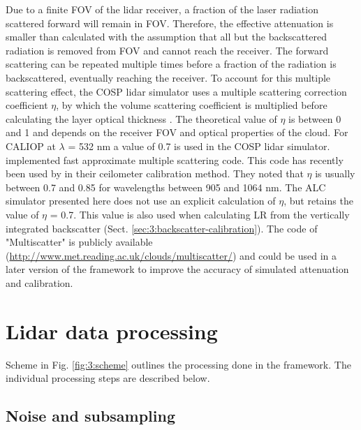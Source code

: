 Due to a finite FOV of the lidar receiver, a fraction of the laser
radiation scattered forward will remain in FOV. Therefore,
the effective attenuation is smaller than calculated with the assumption
that all but the backscattered radiation is removed from FOV and cannot
reach the receiver. The forward scattering can be repeated multiple times
before a fraction of the radiation is backscattered, eventually reaching the
receiver. To account for this multiple scattering effect, the COSP lidar
simulator uses a multiple scattering correction coefficient $\eta$, by
which the volume scattering coefficient is multiplied before calculating
the layer optical thickness \citep{chiriaco2006,chepfer2007,chepfer2008}.
The theoretical value of $\eta$ is between 0 and 1 and depends on the
receiver FOV and optical properties of the cloud. For CALIOP
at $\lambda$ = 532 nm a value of 0.7 is used in the COSP lidar simulator.
\cite{hogan2006} implemented fast approximate multiple
scattering code. This code has recently been used by \cite{hopkin2019} in their
ceilometer calibration method. They noted that $\eta$ is usually between
0.7 and 0.85 for wavelengths between 905 and 1064 nm. The ALC simulator
presented here does not use an explicit calculation of $\eta$, but retains 
the value of $\eta$ = 0.7. This value is also used when calculating LR
from the vertically integrated backscatter
(Sect. \ref{sec:3:backscatter-calibration}). The code of \cite{hogan2006}
"Multiscatter" is publicly available (\url{http://www.met.reading.ac.uk/clouds/multiscatter/}) 
and could be used in a later version of the framework to improve the
accuracy of simulated attenuation and calibration.

\section{Lidar data processing}
\label{sec:3:lidar-data-processing}

Scheme in Fig. \ref{fig:3:scheme} outlines the processing done in the framework.
The individual processing steps are described below.

\subsection{Noise and subsampling}
\label{sec:3:noise-and-subsampling}

